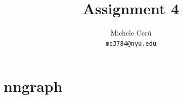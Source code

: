 \documentclass{article}
\title{Assignment 4}
\author{
  Michele Cer\'u
    \\
  \texttt{mc3784@nyu.edu} \\
}
\begin{document}

\maketitle


\section{nngraph}
\end{document}
